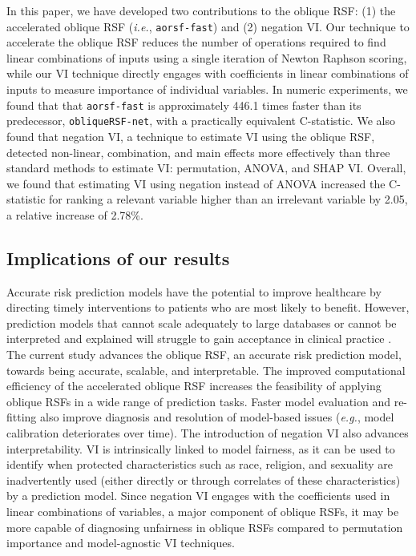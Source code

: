 \documentclass{article}\usepackage[]{graphicx}\usepackage[]{xcolor}
\newcommand{\ie}{\textit{i.e.}}
\newcommand{\eg}{\textit{e.g.}}
\begin{document}
In this paper, we have developed two contributions to the oblique RSF: (1) the accelerated oblique RSF (\ie, \texttt{aorsf-fast}) and (2) negation VI. Our technique to accelerate the oblique RSF reduces the number of operations required to find linear combinations of inputs using a single iteration of Newton Raphson scoring, while our VI technique directly engages with coefficients in linear combinations of inputs to measure importance of individual variables. In numeric experiments, we found that that \texttt{aorsf-fast} is approximately 446.1 times faster than its predecessor, \texttt{obliqueRSF-net}, with a practically equivalent C-statistic. We also found that negation VI, a technique to estimate VI using the oblique RSF, detected non-linear, combination, and main effects more effectively than three standard methods to estimate VI: permutation, ANOVA, and SHAP VI. Overall, we found that estimating VI using negation instead of ANOVA increased the C-statistic for ranking a relevant variable higher than an irrelevant variable by 2.05, a relative increase of 2.78\%.

\subsection{Implications of our results}

Accurate risk prediction models have the potential to improve healthcare by directing timely interventions to patients who are most likely to benefit. However, prediction models that cannot scale adequately to large databases or cannot be interpreted and explained will struggle to gain acceptance in clinical practice \citep{moss2022demystifying}. The current study advances the oblique RSF, an accurate risk prediction model, towards being accurate, scalable, and interpretable. The improved computational efficiency of the accelerated oblique RSF increases the feasibility of applying oblique RSFs in a wide range of prediction tasks. Faster model evaluation and re-fitting also improve diagnosis and resolution of model-based issues (\eg, model calibration deteriorates over time). The introduction of negation VI also advances interpretability. VI is intrinsically linked to model fairness, as it can be used to identify when protected characteristics such as race, religion, and sexuality are inadvertently used (either directly or through correlates of these characteristics) by a prediction model. Since negation VI engages with the coefficients used in linear combinations of variables, a major component of oblique RSFs, it may be more capable of diagnosing unfairness in oblique RSFs compared to permutation importance and model-agnostic VI techniques.
\end{document}
